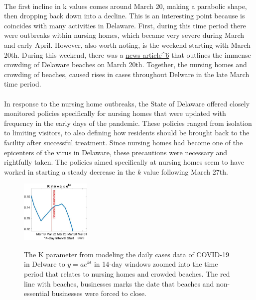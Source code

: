 \documentclass[12pt]{article}
\begin{document}
\paragraph{} The first incline in k values comes around March 20, making a parabolic shape, then dropping back down into a decline. This is an interesting point because is coincides with many activities in Delaware. First, during this time period there were outbreaks within nursing homes, which became very severe during March and early April. However, also worth noting, is the weekend starting with March 20th. During this weekend, there was a \href{https://www.delmarvanow.com/story/news/local/delaware/2020/03/20/rehoboth-beach-draws-crowds-despite-coronavirus-threat-delaware/2887892001/}{news article^6} that outlines the immense crowding of Delaware beaches on March 20th. Together, the nursing homes and crowding of beaches, caused rises in cases throughout Delware in the late March time period.
\paragraph{} In response to the nursing home outbreaks, the State of Delaware offered closely monitored policies specifically for nursing homes that were updated with frequency in the early days of the pandemic. These policies ranged from isolation to limiting visitors, to also defining how residents should be brought back to the facility after successful treatment. Since nursing homes had become one of the epicenters of the virus in Delaware, these precautions were necessary and rightfully taken. The policies aimed specifically at nursing homes seem to have worked in starting a steady decrease in the $k$ value following March 27th.

\begin{figure}[h]
  \centering
    \includegraphics[width=0.3\textwidth]{Figure5.jpg}%
    \label{fig:a}%
  \caption{The K parameter from modeling the daily cases data of COVID-19 in Delware to $y=ae^{kt}$ in 14-day windows zoomed into the time period that relates to nursing homes and crowded beaches. The red line with beaches, businesses marks the date that beaches and non-essential businesses were forced to close.}
  \label{fig:5}
\end{figure}
\end{document}
